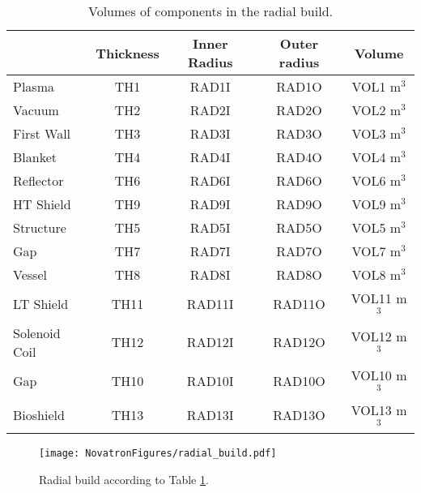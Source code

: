 \begin{table}[h!]
    \centering
    \begin{tabular}{l c  c c c}
    \hline
        &	Thickness	&	Inner Radius	&	Outer radius	&	Volume		\\
        \hline
Plasma	&	TH1	&	RAD1I	&	RAD1O	&	VOL1	m$^{3}$	\\
Vacuum	&	TH2	&	RAD2I	&	RAD2O	&	VOL2	m$^{3}$	\\
First Wall	&	TH3	&	RAD3I	&	RAD3O	&	VOL3	m$^{3}$	\\
Blanket	&	TH4	&	RAD4I	&	RAD4O	&	VOL4	m$^{3}$	\\
Reflector	&	TH6	&	RAD6I	&	RAD6O	&	VOL6	m$^{3}$	\\
HT Shield	&	TH9	&	RAD9I	&	RAD9O	&	VOL9	m$^{3}$	\\
Structure	&	TH5	&	RAD5I	&	RAD5O	&	VOL5	m$^{3}$	\\
Gap	&	TH7	&	RAD7I	&	RAD7O	&	VOL7	m$^{3}$	\\
Vessel	&	TH8	&	RAD8I	&	RAD8O	&	VOL8	m$^{3}$	\\
LT Shield	&	TH11	&	RAD11I	&	RAD11O	&	VOL11	m$^{3}$	\\
Solenoid Coil&	TH12	&	RAD12I	&	RAD12O	&	VOL12	m$^{3}$	\\
Gap	&	TH10	&	RAD10I	&	RAD10O	&	VOL10	m$^{3}$	\\
Bioshield	&	TH13	&	RAD13I	&	RAD13O	&	VOL13	m$^{3}$	\\

        \hline
    \end{tabular}
    \caption{Volumes of components in the radial build.}
    \label{tab:volumes}
\end{table}

\begin{figure}
    \centering
    \texttt{[image: NovatronFigures/radial\_build.pdf]}
    \caption{Radial build according to Table \ref{tab:volumes}.}
    \label{fig:radial}
\end{figure}



